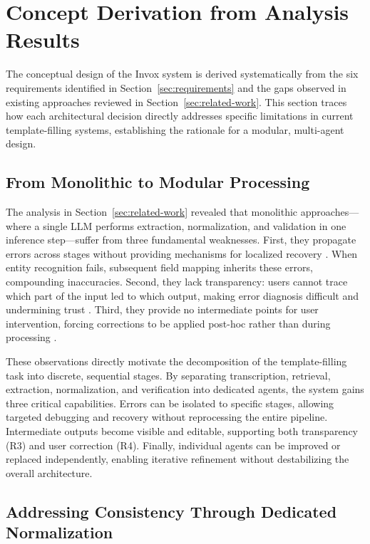 \section{Concept Derivation from Analysis Results}
\label{sec:concept-derivation}

The conceptual design of the Invox system is derived systematically from the six requirements identified in Section~\ref{sec:requirements} and the gaps observed in existing approaches reviewed in Section~\ref{sec:related-work}. This section traces how each architectural decision directly addresses specific limitations in current template-filling systems, establishing the rationale for a modular, multi-agent design.

\subsection{From Monolithic to Modular Processing}
\label{subsec:monolithic-to-modular}

The analysis in Section~\ref{sec:related-work} revealed that monolithic approaches—where a single LLM performs extraction, normalization, and validation in one inference step—suffer from three fundamental weaknesses. First, they propagate errors across stages without providing mechanisms for localized recovery \cite{sun2023slot}. When entity recognition fails, subsequent field mapping inherits these errors, compounding inaccuracies. Second, they lack transparency: users cannot trace which part of the input led to which output, making error diagnosis difficult and undermining trust \cite{ribeiro2016should}. Third, they provide no intermediate points for user intervention, forcing corrections to be applied post-hoc rather than during processing \cite{amershi2019guidelines}.

These observations directly motivate the decomposition of the template-filling task into discrete, sequential stages. By separating transcription, retrieval, extraction, normalization, and verification into dedicated agents, the system gains three critical capabilities. Errors can be isolated to specific stages, allowing targeted debugging and recovery without reprocessing the entire pipeline. Intermediate outputs become visible and editable, supporting both transparency (R3) and user correction (R4). Finally, individual agents can be improved or replaced independently, enabling iterative refinement without destabilizing the overall architecture.

\subsection{Addressing Consistency Through Dedicated Normalization}
\label{subsec:consistency-normalization}


